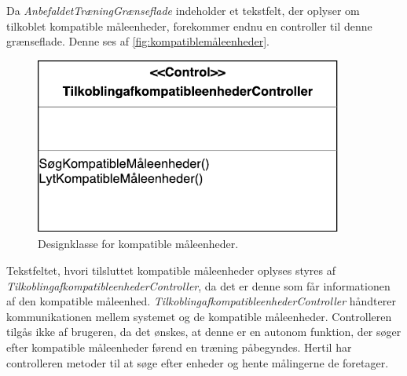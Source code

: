 Da \textit{AnbefaldetTræningGrænseflade} indeholder et tekstfelt, der oplyser om tilkoblet kompatible måleenheder, forekommer endnu en controller til denne grænseflade. Denne ses af \autoref{fig:kompatiblemåleenheder}.

\begin{figure} [H]
\centering
\includegraphics[width=0.9\textwidth]{figures/MVC/MVCKompMaale}
\caption{Designklasse for kompatible måleenheder.}
\label{fig:kompatiblemåleenheder}
\end{figure}

Tekstfeltet, hvori tilsluttet kompatible måleenheder oplyses styres af \textit{TilkoblingafkompatibleenhederController}, da det er denne som får informationen af den kompatible måleenhed.
\textit{TilkoblingafkompatibleenhederController} håndterer kommunikationen mellem systemet og de kompatible måleenheder. Controlleren tilgås ikke af brugeren, da det ønskes, at denne er en autonom funktion, der søger efter kompatible måleenheder førend en træning påbegyndes. Hertil har controlleren metoder til at søge efter enheder og hente målingerne de foretager.

